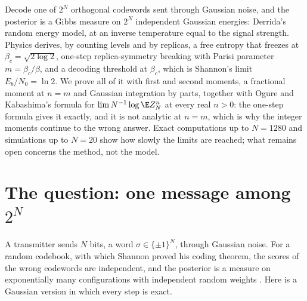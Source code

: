 \begin{refsection}

\begin{chaptersummary}
Decode one of $2^N$ orthogonal codewords sent through Gaussian noise, and the posterior is a Gibbs measure on $2^N$ independent Gaussian energies: Derrida's random energy model, at an inverse temperature equal to the signal strength. Physics derives, by counting levels and by replicas, a free entropy that freezes at $\beta_c=\sqrt{2\log2}$, one-step replica-symmetry breaking with Parisi parameter $m=\beta_c/\beta$, and a decoding threshold at $\beta_c$, which is Shannon's limit $E_b/N_0=\ln2$. We prove all of it with first and second moments, a fractional moment at $n=m$ and Gaussian integration by parts, together with Ogure and Kabashima's formula for $\lim N^{-1}\log\E Z_N^n$ at every real $n>0$: the one-step formula gives it exactly, and it is not analytic at $n=m$, which is why the integer moments continue to the wrong answer. Exact computations up to $N=1280$ and simulations up to $N=20$ show how slowly the limits are reached; what remains open concerns the method, not the model.
\end{chaptersummary}

\section{The question: one message among \texorpdfstring{$2^N$}{2\string^N}}\label{sec:rem:question}

A transmitter sends $N$ bits, a word $\sigma\in\{\pm1\}^N$, through Gaussian noise. For a random codebook, with which Shannon proved his coding theorem, the scores of the wrong codewords are independent, and the posterior is a measure on exponentially many configurations with independent random weights \parencite[ch.~6 and its notes]{MezardMontanari2009}. Here is a Gaussian version in which every step is exact.


\end{refsection}
